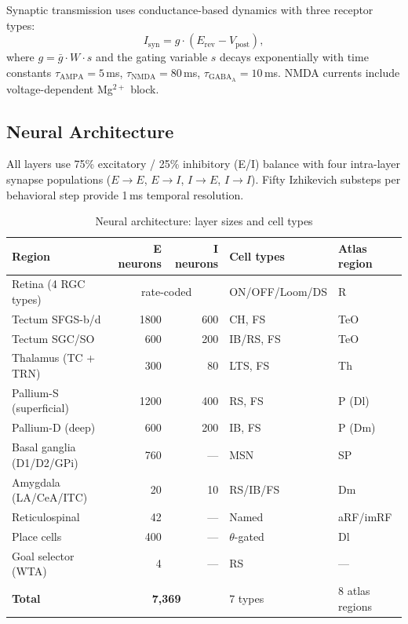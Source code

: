 \documentclass[9pt]{elife}
\begin{document}
Synaptic transmission uses conductance-based dynamics with three receptor types:
\begin{equation}
I_{\mathrm{syn}} = g \cdot (E_{\mathrm{rev}} - V_{\mathrm{post}}),
\end{equation}
where $g = \bar{g} \cdot W \cdot s$ and the gating variable $s$ decays exponentially
with time constants $\tau_{\mathrm{AMPA}} = 5$\,ms, $\tau_{\mathrm{NMDA}} = 80$\,ms,
$\tau_{\mathrm{GABA_A}} = 10$\,ms.
NMDA currents include voltage-dependent Mg$^{2+}$ block.

\subsection{Neural Architecture}

All layers use 75\% excitatory / 25\% inhibitory (E/I) balance with four
intra-layer synapse populations ($E \to E$, $E \to I$, $I \to E$, $I \to I$).
Fifty Izhikevich substeps per behavioral step provide 1\,ms temporal resolution.

\begin{table}[h!]
\centering
\caption{Neural architecture: layer sizes and cell types}
\renewcommand{\arraystretch}{1.15}
\begin{tabular}{l r r l l}
\hline
\textbf{Region} & \textbf{E neurons} & \textbf{I neurons} & \textbf{Cell types} & \textbf{Atlas region} \\
\hline
Retina (4 RGC types)     & \multicolumn{2}{c}{rate-coded}   & ON/OFF/Loom/DS    & R \\
Tectum SFGS-b/d           & 1800 & 600  & CH, FS   & TeO \\
Tectum SGC/SO             & 600  & 200  & IB/RS, FS & TeO \\
Thalamus (TC + TRN)       & 300  & 80   & LTS, FS  & Th \\
Pallium-S (superficial)   & 1200 & 400  & RS, FS   & P (Dl) \\
Pallium-D (deep)          & 600  & 200  & IB, FS   & P (Dm) \\
Basal ganglia (D1/D2/GPi) & 760  & ---  & MSN      & SP \\
Amygdala (LA/CeA/ITC)     & 20   & 10   & RS/IB/FS & Dm \\
Reticulospinal            & 42   & ---  & Named    & aRF/imRF \\
Place cells               & 400  & ---  & $\theta$-gated & Dl \\
Goal selector (WTA)       & 4    & ---  & RS       & --- \\
\hline
\textbf{Total}            & \multicolumn{2}{c}{\textbf{7,369}} & 7 types & 8 atlas regions \\
\hline
\end{tabular}
\end{table}
\end{document}
